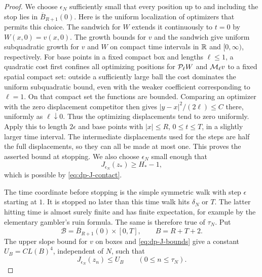 \begin{proof}
We choose $\epsilon_N$ sufficiently small that every position up to and
including the stop lies in $\overline B_{R+1}(0)$.  Here is the uniform
localization of optimizers that permits this choice.  The sandwich for $W$
extends it continuously to $t=0$ by $W(x,0)=v(x,0)$.  The growth bounds for
$v$ and the sandwich give uniform subquadratic growth for $v$ and $W$ on
compact time intervals in $\mathbb{R}$ and $[0,\infty)$, respectively.  For base
points in a fixed compact box and lengths
$\ell\le1$, a quadratic cost first confines all optimizing positions for
$\mathcal{P}_\ell W$ and $\mathcal{M}_\ell v$ to a fixed spatial compact set: outside a
sufficiently large ball the cost dominates the uniform subquadratic bound,
even with the weaker coefficient corresponding to $\ell=1$.  On that compact
set the functions are bounded.  Comparing an optimizer with the zero
displacement competitor then gives $|y-x|^2/(2\ell)\le C$ there, uniformly
as $\ell\downarrow0$.  Thus the optimizing displacements tend to zero
uniformly.  Apply this to length $2\epsilon$ and base points with
$|x|\le R$, $0\le t\le T$, in a slightly larger time interval.  The
intermediate displacements used for the steps are half the full
displacements, so they can all be made at most one.  This proves the asserted
bound at stopping.  We also choose $\epsilon_N$ small enough that
\begin{equation}\label{eq:contact-start-lower}
  J_{\epsilon_N}(z_*)\ge H_*-1,
\end{equation}
which is possible by \eqref{eq:dp-J-contact}.

The time coordinate before stopping is the simple symmetric walk with step
$\epsilon$ starting at $1$.  It is stopped no later than this time walk hits
$\delta_N$ or $T$.  The latter hitting time is almost surely finite and has
finite expectation, for example by the elementary gambler's ruin formula.
The same is therefore true of $\tau_N$.  Put
\[
  \mathcal B=\overline B_{R+1}(0)\times[0,T],\qquad B=R+T+2.
\]
The upper slope bound for $v$ on boxes and \eqref{eq:dp-J-bounds} give a
constant $U_B=C L(B)^4$, independent of $N$, such that
\begin{equation}\label{eq:contact-J-upper}
  J_{\epsilon_N}(z_n)\le U_B\qquad (0\le n\le\tau_N).
\end{equation}


\end{proof}

